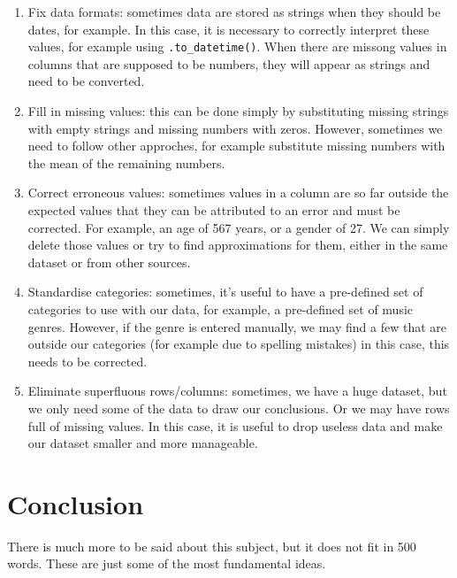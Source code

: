 \documentclass[10pt,a4paper]{article}
\begin{document}
\begin{enumerate}
\item Fix data formats: sometimes data are stored as strings when they
  should be dates, for example.  In this case, it is necessary to
  correctly interpret these values, for example using
  \texttt{.to\_datetime()}.  When there are missong values in columns
  that are supposed to be numbers, they will appear as strings and
  need to be converted.
\item Fill in missing values: this can be done simply by substituting
  missing strings with empty strings and missing numbers with zeros.
  However, sometimes we need to follow other approches, for example
  substitute missing numbers with the mean of the remaining numbers.
\item Correct erroneous values: sometimes values in a column are so
  far outside the expected values that they can be attributed to an
  error and must be corrected.  For example, an age of 567 years, or a
  gender of 27.  We can simply delete those values or try to find
  approximations for them, either in the same dataset or from other
  sources.
\item Standardise categories: sometimes, it's useful to have a
  pre-defined set of categories to use with our data, for example, a
  pre-defined set of music genres.  However, if the genre is entered
  manually, we may find a few that are outside our categories (for
  example due to spelling mistakes) in this case, this needs to be
  corrected.
\item Eliminate superfluous rows/columns: sometimes, we have a huge
  dataset, but we only need some of the data to draw our conclusions.
  Or we may have rows full of missing values.  In this case, it is
  useful to drop useless data and make our dataset smaller and more
  manageable.
\end{enumerate}

\section{Conclusion}

There is much more to be said about this subject, but it does not fit in
500 words.  These are just some of the most fundamental ideas.
\end{document}
